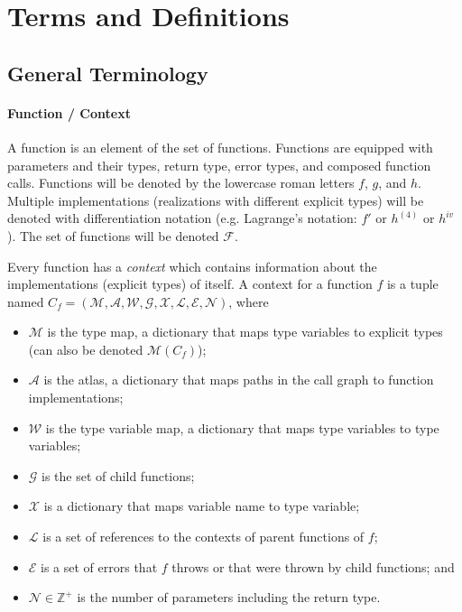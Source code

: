 \documentclass[10pt]{article}
\begin{document}
\pagebreak
\section{Terms and Definitions}

\subsection{General Terminology}
	\paragraph{Function / Context} 
	A function is an element of the set of functions. Functions are equipped
	with parameters and their types, return type, error types, and composed
	function calls.  Functions will be denoted by the lowercase roman letters
	$f$, $g$, and $h$.  Multiple implementations (realizations with different
	explicit types) will be denoted with differentiation notation (e.g.
	Lagrange's notation: $f'$ or $h^{(4)}$ or $h^{iv}$).  The set of functions
	will be denoted $\mathcal{F}$.

	Every function has a \emph{context} which contains information about the
	implementations (explicit types) of itself. A context for a function $f$ is
	a tuple named $C_f = (\mathcal{M}, \mathcal{A}, \mathcal{W}, \mathcal{G},
	\mathcal{X}, \mathcal{L}, \mathcal{E}, \mathcal{N})$, where
	\begin{itemize}[noitemsep]
		\item $\mathcal{M}$ is the type map, a dictionary that maps type
			variables to explicit types (can also be denoted
			$\mathcal{M}(C_f)$);
		\item $\mathcal{A}$ is the atlas, a dictionary that maps paths in the
			call graph to function implementations;
		\item $\mathcal{W}$ is the type variable map, a dictionary that maps
			type variables to type variables;
		\item $\mathcal{G}$ is the set of child functions;
		\item $\mathcal{X}$ is a dictionary that maps variable name to type
			variable;
		\item $\mathcal{L}$ is a set of references to the contexts of parent
			functions of $f$;
		\item $\mathcal{E}$ is a set of errors that $f$ throws or that were
			thrown by child functions; and
		\item $\mathcal{N} \in \mathbb{Z}^+$ is the number of parameters
			including the return type.
	\end{itemize}
\end{document}
